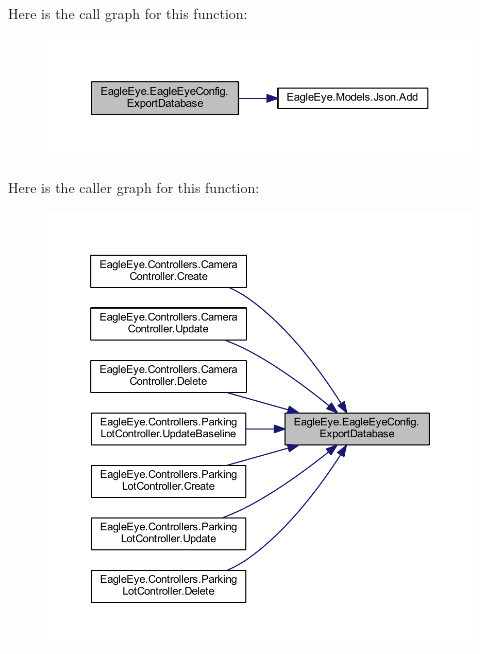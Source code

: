 Here is the call graph for this function\+:\nopagebreak
\begin{figure}[H]
\begin{center}
\leavevmode
\includegraphics[width=350pt]{class_eagle_eye_1_1_eagle_eye_config_ae238a449c2d6a52f9825fb75096e2299_cgraph}
\end{center}
\end{figure}
Here is the caller graph for this function\+:
\nopagebreak
\begin{figure}[H]
\begin{center}
\leavevmode
\includegraphics[width=350pt]{class_eagle_eye_1_1_eagle_eye_config_ae238a449c2d6a52f9825fb75096e2299_icgraph}
\end{center}
\end{figure}
\mbox{\label{class_eagle_eye_1_1_eagle_eye_config_a321d469bb1a71e255f2318ad1ec30058}} 
